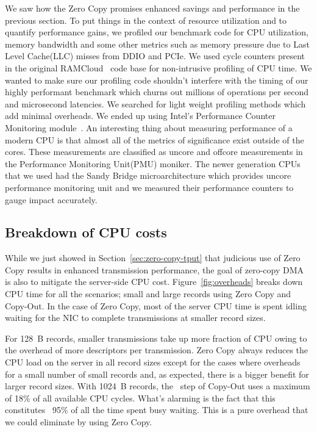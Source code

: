 We saw how the Zero Copy promises enhanced savings and performance 
in the previous section. To put things in the context of resource utilization and
 to quantify performance gains, we profiled our benchmark code for CPU utilization, memory bandwidth 
 and some other metrics such as memory pressure due to Last Level Cache(LLC) misses from DDIO and PCIe.
We used cycle counters present in the original RAMCloud~\cite{ramcloud} code base for non-intrusive profiling 
of CPU time. We wanted to make sure our profiling code shouldn't interfere with the timing of our highly performant 
 benchmark which churns out millions of operations per second and microsecond latencies. 
 We searched for light weight profiling methods which add minimal overheads.
 We ended up using Intel\textregistered's Performance Counter Monitoring module~\cite{intelpcm}. 
 An interesting thing about measuring performance 
 of a modern CPU is that almost all of the metrics of significance exist outside of the cores. These measurements 
 are classified as uncore and offcore measurements in the Performance Monitoring Unit(PMU) moniker.
 The newer generation CPUs that we used had the Sandy Bridge microarchitecture which provides uncore performance 
 monitoring unit and we measured their performance counters to gauge impact accurately.


\subsection{Breakdown of CPU costs}
\label{sec:overhead}

While we just showed in Section~\ref{sec:zero-copy-tput} that judicious use of Zero Copy results 
in enhanced transmission performance, the goal of zero-copy DMA is also to 
mitigate the server-side CPU cost. Figure~\ref{fig:overheads} breaks down CPU time for 
all the scenarios; small and large records using Zero Copy and Copy-Out. In the case 
of Zero Copy, most of the server CPU time is spent idling waiting for the NIC 
to complete transmissions at smaller record sizes.

 For 128~B records, smaller transmissions take up more fraction of CPU owing to the overhead of more descriptors
per transmission. Zero Copy always reduces the CPU load on the server in all record sizes except for the cases where
overheads for a small number of small records and, as expected, there is a bigger
benefit for larger record sizes. With 1024~B records, the \memcpy ~step of Copy-Out uses a maximum of 18\% of all available
CPU cycles. What's alarming is the fact that this constitutes ~95\% of all the time spent busy waiting.
This is a pure overhead that we could eliminate by using Zero Copy.

